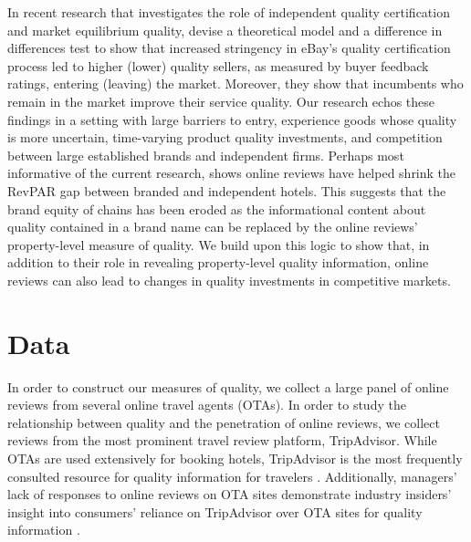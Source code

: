 \documentclass[mksc,blindrev]{informs3} %
\begin{document}
In recent research that investigates the role of independent quality certification and market equilibrium quality, \citet{hui2018certification} devise a theoretical model and a difference in differences test to show that increased stringency in eBay's quality certification process led to higher (lower) quality sellers, as measured by buyer feedback ratings, entering (leaving) the market. Moreover, they show that incumbents who remain in the market improve their service quality. Our research echos these findings in a setting with large barriers to entry, experience goods whose quality is more uncertain, time-varying product quality investments, and competition between large established brands and independent firms. Perhaps most informative of the current research, \citet{hollenbeck2018} shows online reviews have helped shrink the RevPAR gap between branded and independent hotels. This suggests that the brand equity of chains has been eroded as the informational content about quality contained in a brand name can be replaced by the online reviews' property-level measure of quality. We build upon this logic to show that, in addition to their role in revealing property-level quality information, online reviews can also lead to changes in quality investments in competitive markets.

\section{Data}\label{sec:data}

In order to construct our measures of quality, we collect a large panel of online reviews from several online travel agents (OTAs). In order to study the relationship between quality and the penetration of online reviews, we collect reviews from the most prominent travel review platform, TripAdvisor. While OTAs are used extensively for booking hotels, TripAdvisor is the most frequently consulted resource for quality information for travelers \citep{LVsurvey2016}. Additionally, managers' lack of responses to online reviews on OTA sites demonstrate industry insiders' insight into consumers' reliance on TripAdvisor over OTA sites for quality information \citep{proserpio2017online}.
\end{document}
